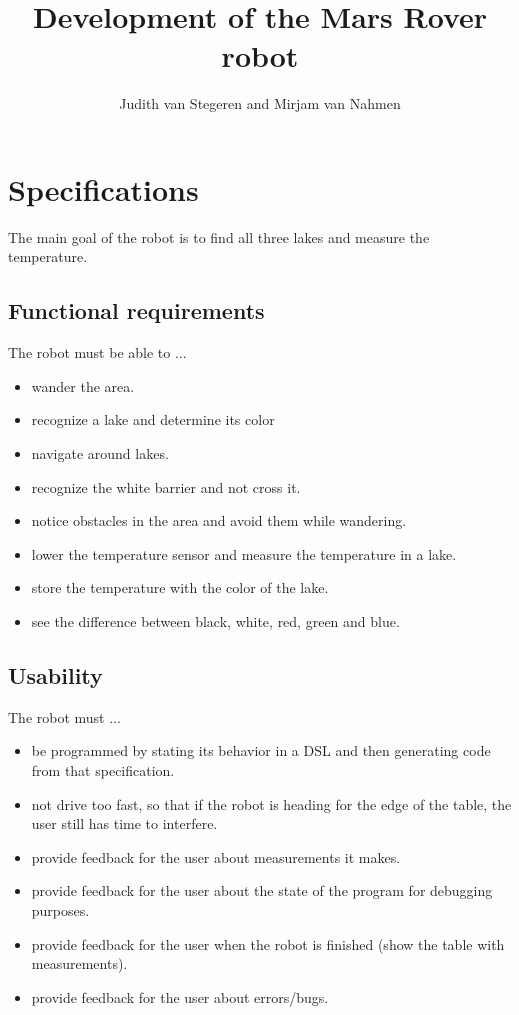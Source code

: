 \documentclass[10pt,a4paper]{article}
\author{Judith van Stegeren and Mirjam van Nahmen}
\title{Development of the Mars Rover robot}
\begin{document}
\maketitle

\section*{Specifications}
The main goal of the robot is to find all three lakes and measure the temperature.

\subsection*{Functional requirements}
The robot must be able to ...
\begin{itemize} 
\item wander the area.
\item recognize a lake and determine its color
\item navigate around lakes.
\item recognize the white barrier and not cross it.
\item notice obstacles in the area and avoid them while wandering.
\item lower the temperature sensor and measure the temperature in a lake.
\item store the temperature with the color of the lake.
\item see the difference between black, white, red, green and blue.
\end{itemize}


\subsection*{Usability}
The robot must ...
\begin{itemize}
\item be programmed by stating its behavior in a DSL and then generating code from that specification.
\item not drive too fast, so that if the robot is heading for the edge of the table, the user still has time to interfere.
\item provide feedback for the user about measurements it makes.
\item provide feedback for the user about the state of the program for debugging purposes.
\item provide feedback for the user when the robot is finished (show the table with measurements).
\item provide feedback for the user about errors/bugs.
\end{itemize}
\end{document}
